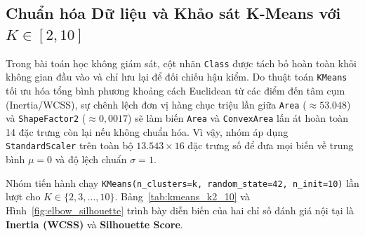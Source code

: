 \documentclass[a4paper,12pt]{report}
\begin{document}
\subsection{Chuẩn hóa Dữ liệu và Khảo sát K-Means với \texorpdfstring{$K \in [2, 10]$}{K tu 2 den 10}}
Trong bài toán học không giám sát, cột nhãn \texttt{Class} được tách bỏ hoàn toàn khỏi không gian đầu vào và chỉ lưu lại để đối chiếu hậu kiểm. Do thuật toán \texttt{KMeans} tối ưu hóa tổng bình phương khoảng cách Euclidean từ các điểm đến tâm cụm (Inertia/WCSS), sự chênh lệch đơn vị hàng chục triệu lần giữa \texttt{Area} ($\approx 53.048$) và \texttt{ShapeFactor2} ($\approx 0,0017$) sẽ làm biến \texttt{Area} và \texttt{ConvexArea} lấn át hoàn toàn 14 đặc trưng còn lại nếu không chuẩn hóa. Vì vậy, nhóm áp dụng \texttt{StandardScaler} trên toàn bộ $13.543 \times 16$ đặc trưng số để đưa mọi biến về trung bình $\mu = 0$ và độ lệch chuẩn $\sigma = 1$.

Nhóm tiến hành chạy \texttt{KMeans(n\_clusters=k, random\_state=42, n\_init=10)} lần lượt cho $K \in \{2, 3, \dots, 10\}$. Bảng~\ref{tab:kmeans_k2_10} và Hình~\ref{fig:elbow_silhouette} trình bày diễn biến của hai chỉ số đánh giá nội tại là \textbf{Inertia (WCSS)} và \textbf{Silhouette Score}.

\begin{table}[H]
\centering
\caption{Kết quả chỉ số Inertia (WCSS) và Silhouette Score của thuật toán K-Means theo $K \in [2, 10]$}
\label{tab:kmeans_k2_10}
\end{table}
\end{document}
